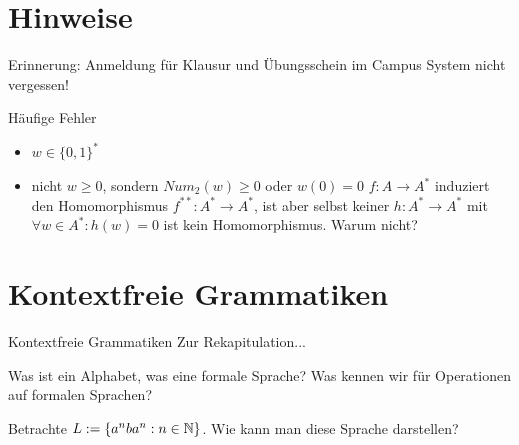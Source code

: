 \documentclass[handout]{beamer}
\begin{document}
	
	
\begin{frame}
	\titlepage
\end{frame}

\section{Hinweise}

\begin{frame}
Erinnerung: Anmeldung für Klausur und Übungsschein im Campus System nicht vergessen!
\end{frame}

\begin{frame} {Häufige Fehler}
\begin{itemize}
	\item $w \in \{0, 1\}^*$
	\item nicht $w \geq 0$, sondern $Num_2 (w) \geq 0$ oder $w(0)=0$
	\pitem $f:A \rightarrow A^*$ induziert den Homomorphismus $f^{**}:A^* \rightarrow A^*$, ist aber selbst keiner
	\pitem $h:A^* \rightarrow A^*$ mit $\forall w \in A^*: h(w) = 0$ ist kein Homomorphismus. Warum nicht?
\end{itemize}
\end{frame}

\section{Kontextfreie Grammatiken}
\begin{frame}{Kontextfreie Grammatiken}
	Zur Rekapitulation...
	
	\begin{itemize}
		\pitem Was ist ein Alphabet, was eine formale Sprache?
		\pitem Was kennen wir für Operationen auf formalen Sprachen?
	\end{itemize}

	\bp 
	
	Betrachte $L := \{a^nba^n : n \in \mathbb{N} \}$. \ip Wie kann man diese Sprache darstellen?
\end{frame}
\end{document}
